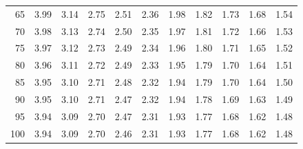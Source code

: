 \documentclass{article}
\begin{document}
\begin{tabular}{|r|rrrrrrrrrr|}
		65 & 3.99 & 3.14 & 2.75 & 2.51 & 2.36 & 1.98 & 1.82 & 1.73 & 1.68 & 1.54 \\ 
		70 & 3.98 & 3.13 & 2.74 & 2.50 & 2.35 & 1.97 & 1.81 & 1.72 & 1.66 & 1.53 \\ 
		75 & 3.97 & 3.12 & 2.73 & 2.49 & 2.34 & 1.96 & 1.80 & 1.71 & 1.65 & 1.52 \\ 
		80 & 3.96 & 3.11 & 2.72 & 2.49 & 2.33 & 1.95 & 1.79 & 1.70 & 1.64 & 1.51 \\ 
		85 & 3.95 & 3.10 & 2.71 & 2.48 & 2.32 & 1.94 & 1.79 & 1.70 & 1.64 & 1.50 \\ 
		90 & 3.95 & 3.10 & 2.71 & 2.47 & 2.32 & 1.94 & 1.78 & 1.69 & 1.63 & 1.49 \\ 
		95 & 3.94 & 3.09 & 2.70 & 2.47 & 2.31 & 1.93 & 1.77 & 1.68 & 1.62 & 1.48 \\ 
		100 & 3.94 & 3.09 & 2.70 & 2.46 & 2.31 & 1.93 & 1.77 & 1.68 & 1.62 & 1.48 \\ 
		\hline
	\end{tabular}
	
\end{document}
